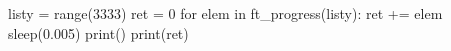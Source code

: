 \documentclass[]{article}
\newenvironment{Shaded}{\begin{snugshade}}{\end{snugshade}}
\newcommand{\BuiltInTok}[1]{\textcolor[rgb]{0.50,0.55,0.55}{#1}}
\newcommand{\ControlFlowTok}[1]{\textcolor[rgb]{0.99,0.74,0.29}{#1}}
\newcommand{\DecValTok}[1]{\textcolor[rgb]{0.96,0.45,0.00}{#1}}
\newcommand{\FloatTok}[1]{\textcolor[rgb]{0.96,0.45,0.00}{#1}}
\newcommand{\KeywordTok}[1]{\textcolor[rgb]{0.81,0.81,0.76}{#1}}
\newcommand{\NormalTok}[1]{\textcolor[rgb]{0.81,0.81,0.76}{#1}}
\newcommand{\OperatorTok}[1]{\textcolor[rgb]{0.81,0.81,0.76}{#1}}
\begin{document}
\begin{Shaded}
\end{Shaded}

\begin{Shaded}
\begin{Highlighting}[]
\NormalTok{listy }\OperatorTok{=} \BuiltInTok{range}\NormalTok{(}\DecValTok{3333}\NormalTok{)}
\NormalTok{ret }\OperatorTok{=} \DecValTok{0}
\ControlFlowTok{for}\NormalTok{ elem }\KeywordTok{in}\NormalTok{ ft_progress(listy):}
\NormalTok{    ret }\OperatorTok{+=}\NormalTok{ elem}
\NormalTok{    sleep(}\FloatTok{0.005}\NormalTok{)}
\BuiltInTok{print}\NormalTok{()}
\BuiltInTok{print}\NormalTok{(ret)}
\end{Highlighting}
\end{Shaded}

\begin{Shaded}
\end{Shaded}

\clearpage
\end{document}
